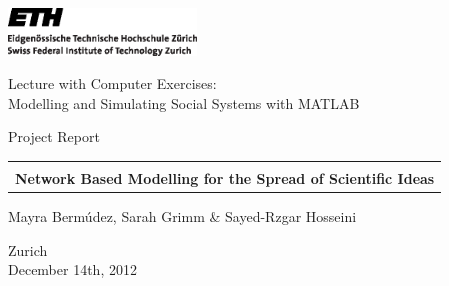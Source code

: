 
\thispagestyle{empty}

\begin{center}
\includegraphics[width=5cm]{ETHlogo.eps}

\bigskip


\bigskip


\bigskip


\LARGE{ 	Lecture with Computer Exercises:\\ }
\LARGE{ Modelling and Simulating Social Systems with MATLAB\\}

\bigskip

\bigskip

\small{Project Report}\\

\bigskip

\bigskip

\bigskip

\bigskip


\begin{tabular}{|c|}
\hline
\\
\textbf{\LARGE{Network Based Modelling for the Spread of Scientific Ideas}}\\ %
\hline
\end{tabular}
\bigskip

\bigskip

\bigskip

\LARGE{Mayra Berm\'udez, Sarah Grimm \& Sayed-Rzgar Hosseini}



\bigskip

\bigskip

\bigskip

\bigskip

\bigskip

\bigskip

\bigskip

\bigskip

Zurich\\

December 14th, 2012\\

\end{center}


